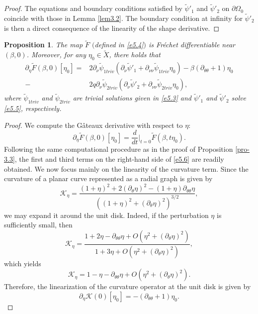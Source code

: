\documentclass[reqno]{amsart}
\numberwithin{equation}{section}
\newtheorem{proposition}[theorem]{Proposition}
\numberwithin{equation}{section}
\numberwithin{equation}{section}
\begin{document}
\begin{proof}
The equations and boundary conditions satisfied by \(\widetilde{\psi}'_{1}\) and \(\widetilde{\psi}'_{2}\) on
$\partial \Omega_0$ coincide with those in Lemma \ref{lem3.2}. The boundary condition at infinity for \(\widetilde{\psi}'_{2}\) is then a direct consequence of the linearity of the shape derivative.
\end{proof}

\begin{proposition}\label{pro-5.3}
The map \(\widetilde{F}\) $($defined in \eqref{e5.4}$)$ is Fr\'{e}chet differentiable near \((\beta,0)\). Moreover, for any \(\eta_0 \in \widetilde{X}\), there holds that
\begin{equation}\label{e5.6}
\begin{aligned}
\partial_{\eta} \widetilde{F}(\beta,0)[\eta_0] =&2\partial_{\nu}\widetilde{\psi}_{1triv}\left(\partial_{\nu}\widetilde{\psi}'_{1}+\partial_{\nu\nu}\widetilde{\psi}_{1triv} \eta_0\right)
-\beta(\partial_{\theta\theta}+1)\eta_0\\
-&2q\partial_{\nu}\widetilde{\psi}_{2triv}\left(\partial_{\nu}\widetilde{\psi}'_{2}+
\partial_{\nu\nu}\widetilde{\psi}_{2triv} \eta_0\right),
\end{aligned}
\end{equation}
where $\widetilde{\psi}_{1triv}$ and $\widetilde{\psi}_{2triv}$ are trivial solutions given in \eqref{e5.3} and \(\widetilde{\psi}'_{1}\) and \(\widetilde{\psi}'_{2}\) solve \eqref{e5.5}, respectively.
\end{proposition}

\begin{proof}
We compute the G\^{a}teaux derivative with respect to \(\eta\):
\[
\partial_\eta \widetilde{F}(\beta,0)[\eta_0] = \frac{d}{dt}\Big|_{t=0} \widetilde{F}(\beta,t\eta_0).
\]
Following the same computational procedure as in the proof of Proposition \ref{pro-3.3}, the first and third terms on the right-hand side of \eqref{e5.6} are readily obtained. We now focus mainly on the linearity of the curvature term. Since the curvature of a planar curve represented as a radial graph is given by
\[
\mathcal{K}_{\eta}
=
\frac{(1+\eta)^2+2(\partial_{\theta}\eta)^2
-(1+\eta)\partial_{\theta\theta}\eta}
{\left((1+\eta)^2+(\partial_{\theta}\eta)^2\right)^{3/2}},
\]
we may expand it around the unit disk. Indeed, if the perturbation $\eta$ is sufficiently small, then
\[
\mathcal{K}_{\eta}
=
\frac{
1+2\eta-\partial_{\theta\theta}\eta
+O\!\left(\eta^2+(\partial_{\theta}\eta)^2\right)
}
{
1+3\eta
+O\!\left(\eta^2+(\partial_{\theta}\eta)^2\right)
},
\]
which yields
\[
\mathcal{K}_{\eta}
=
1-\eta-\partial_{\theta\theta}\eta
+O\!\left(\eta^2+(\partial_{\theta}\eta)^2\right).
\]
Therefore, the linearization of the curvature operator at the unit disk is given by
\[
\partial_{\eta}\mathcal{K}(0)[\eta_0]
=
-\left(\partial_{\theta\theta}+1\right)\eta_0.
\]
\end{proof}
\end{document}
